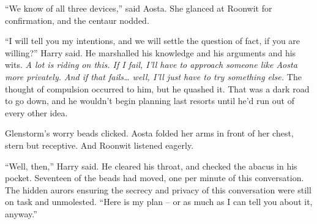 ``We know of all three devices,'' said Aosta. She glanced at Roonwit for
confirmation, and the centaur nodded.

``I will tell you my intentions, and we will settle the question of
fact, if you are willing?'' Harry said. He marshalled his knowledge and
his arguments and his wits. \emph{A lot is riding on this. If I fail,
I'll have to approach someone like Aosta more privately. And if that
fails\ldots{} well, I'll just have to try something else.} The thought
of compulsion occurred to him, but he quashed it. That was a dark road
to go down, and he wouldn't begin planning last resorts until he'd run
out of every other idea.

Glenstorm's worry beads clicked. Aosta folded her arms in front of her
chest, stern but receptive. And Roonwit listened eagerly.

``Well, then,'' Harry said. He cleared his throat, and checked the
abacus in his pocket. Seventeen of the beads had moved, one per minute
of this conversation. The hidden aurors ensuring the secrecy and privacy
of this conversation were still on task and unmolested. ``Here is my
plan -- or as much as I can tell you about it, anyway.'' \Stopbonus
